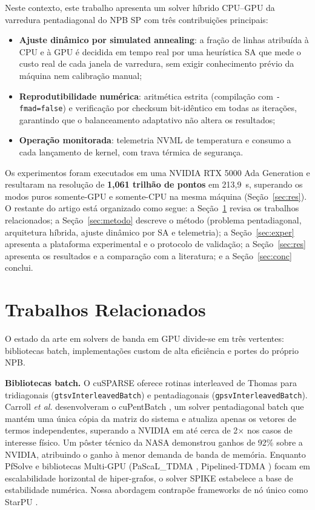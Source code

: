 \documentclass[12pt]{article}
\begin{document}
Neste contexto, este trabalho apresenta um solver híbrido CPU--GPU da
varredura pentadiagonal do NPB SP com três contribuições principais:

\begin{itemize}\setlength\itemsep{0em}
  \item \textbf{Ajuste dinâmico por simulated annealing}: a fração de linhas
  atribuída à CPU e à GPU é decidida em tempo real por uma heurística SA que
  mede o custo real de cada janela de varredura, sem exigir conhecimento
  prévio da máquina nem calibração manual;
  \item \textbf{Reprodutibilidade numérica}: aritmética estrita
  (compilação com \texttt{-fmad=false}) e verificação por checksum
  bit-idêntico em todas as iterações, garantindo que o balanceamento
  adaptativo não altera os resultados;
  \item \textbf{Operação monitorada}: telemetria NVML de temperatura e
  consumo a cada lançamento de kernel, com trava térmica de segurança.
\end{itemize}

Os experimentos foram executados em uma NVIDIA RTX 5000 Ada Generation e
resultaram na resolução de \textbf{1,061 trilhão de pontos} em 213,9~s,
superando os modos puros somente-GPU e somente-CPU na mesma máquina
(Seção~\ref{sec:res}). O restante do artigo está organizado como segue: a
Seção~\ref{sec:rel} revisa os trabalhos relacionados; a
Seção~\ref{sec:metodo} descreve o método (problema pentadiagonal,
arquitetura híbrida, ajuste dinâmico por SA e telemetria); a
Seção~\ref{sec:exper} apresenta a plataforma experimental e o protocolo de
validação; a Seção~\ref{sec:res} apresenta os resultados e a comparação com
a literatura; e a Seção~\ref{sec:conc} conclui.

\section{Trabalhos Relacionados}\label{sec:rel}

O estado da arte em solvers de banda em GPU divide-se em três vertentes:
bibliotecas batch, implementações custom de alta eficiência e portes do
próprio NPB.

\textbf{Bibliotecas batch.} O cuSPARSE oferece rotinas interleaved de
Thomas para tridiagonais (\texttt{gtsvInterleavedBatch}) e pentadiagonais
(\texttt{gpsvInterleavedBatch}). Carroll \emph{et al.} desenvolveram o
cuPentBatch \cite{carroll:2019}, um solver pentadiagonal batch que mantém
uma única cópia da matriz do sistema e atualiza apenas os vetores de
termos independentes, superando a NVIDIA em até cerca de 2$\times$ nos
casos de interesse físico. Um pôster técnico da NASA \cite{nasa:2021} demonstrou ganhos de 92\% sobre a NVIDIA, atribuindo o ganho à menor demanda de banda de memória. Enquanto PfSolve \cite{pfsolve:2025} e bibliotecas Multi-GPU (PaScaL\_TDMA \cite{kang:2023}, Pipelined-TDMA \cite{kim:2025}) focam em escalabilidade horizontal de hiper-grafos, o solver SPIKE \cite{chang:2012} estabelece a base de estabilidade numérica. Nossa abordagem contrapõe frameworks de nó único como StarPU \cite{starpu:2011}.
\end{document}
